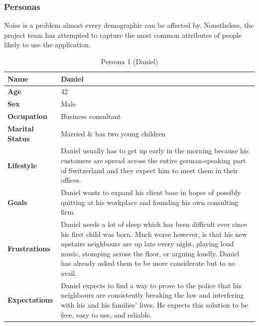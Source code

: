 \subsubsection{Personas}
\label{subsubsec:personas}
Noise is a problem almost every demographic can be affected by. Nonetheless, the project team has attempted to capture the most common attributes of people
likely to use the application. \\
\begin{table}[H]
    \centering
    \begin{tabularx}{\textwidth}{|l|X|}
        \hline
        \textbf{Name} & Daniel \\
        \hline
        \textbf{Age} & 42 \\
        \hline
        \textbf{Sex} & Male \\
        \hline
        \textbf{Occupation} & Business consultant \\
        \hline
        \textbf{Marital Status} & Married \& has two young children \\
        \hline
        \textbf{Lifestyle} & Daniel usually has to get up early in the morning because his
        customers are spread across the entire german-speaking part of Switzerland and they expect him to meet them in their offices. \\
        \hline
        \textbf{Goals} & Daniel wants to expand his client base in hopes of possibly quitting at his workplace and founding his own consulting firm. \\
        \hline
        \textbf{Frustrations} & Daniel needs a lot of sleep which has been difficult ever since his first child was born.
        Much worse however, is that his new upstairs neighbours are up late every night, playing loud music,
        stomping across the floor, or arguing loudly. Daniel has already asked them to be more considerate but to no avail. \\
        \hline
        \textbf{Expectations} & Daniel expects to find a way to prove to the police that his neighbours are consistently
        breaking the law and interfering with his and his families' lives. He expects this solution to be free, easy to use, and reliable. \\
        \hline
    \end{tabularx}
    \caption{Persona 1 (Daniel)}
    \label{table:persona1}
\end{table}

